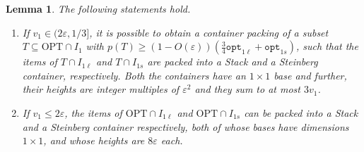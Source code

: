 \documentclass[10pt,a4paper]{amsart}
\renewcommand{\epsilon}{\varepsilon} %
\newtheorem{lemma}[theorem]{Lemma}
\theoremstyle{definition}
\newcommand{\optonel}{\mathtt{opt}_{1\ell}}
\newcommand{\optones}{\mathtt{opt}_{1s}}
\begin{document}
\begin{lemma}
\label{lem:stackandstein}
    The following statements hold.
    \begin{enumerate}
        \item If $v_1 \in (2\epsilon, 1/3]$, it is possible to obtain a container packing of a subset $T \subseteq \text{OPT}\cap I_1$ with $p(T) \ge (1-O(\epsilon))\left(\frac{3}{4}\optonel + \optones\right)$, such that the items of $T\cap I_{1\ell}$ and $T\cap I_{1s}$ are packed into a Stack and a Steinberg container, respectively. Both the containers have an $1\times 1$ base and further, their heights are integer multiples of $\epsilon^2$ and they sum to at most $3v_1$.
        \item If $v_1 \le 2\epsilon$, the items of $\text{OPT}\cap I_{1\ell}$ and $\text{OPT}\cap I_{1s}$ can be packed into a Stack and a Steinberg container respectively, both of whose bases have dimensions $1\times 1$, and whose heights are $8\epsilon$ each.
    \end{enumerate}    
\end{lemma}
\end{document}
